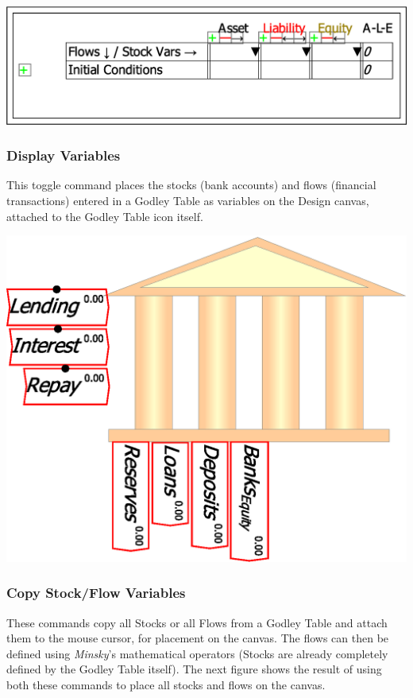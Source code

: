 \noindent\includegraphics[width=\textwidth]{images/GodleyTableEditModeButtons}

\subsubsection{Display Variables}

This toggle command places the stocks (bank accounts) and flows (financial
transactions) entered in a Godley Table as variables on the Design
canvas, attached to the Godley Table icon itself.

\noindent\includegraphics[width=\textwidth]{images/GodleyTableIconModeShowVariables}

\subsubsection{Copy Stock/Flow Variables}

These commands copy all Stocks or all Flows from a Godley Table and
attach them to the mouse cursor, for placement on the canvas. The
flows can then be defined using \emph{Minsky}'s mathematical operators
(Stocks are already completely defined by the Godley Table itself).
The next figure shows the result of using both these commands to place
all stocks and flows on the canvas.

